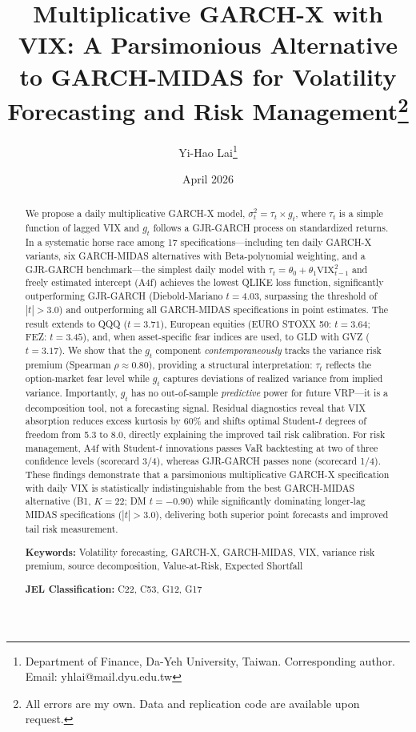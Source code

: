 \documentclass[12pt,a4paper]{article}
\title{Multiplicative GARCH-X with VIX: A Parsimonious Alternative to GARCH-MIDAS for Volatility Forecasting and Risk Management\thanks{All errors are my own. Data and replication code are available upon request.}}
\author{Yi-Hao Lai\thanks{Department of Finance, Da-Yeh University, Taiwan. Corresponding author. Email: yhlai@mail.dyu.edu.tw}}
\date{April 2026}
\begin{document}
\maketitle

\begin{abstract}
\noindent
We propose a daily multiplicative GARCH-X model, $\sigma_t^2 = \tau_t \times g_t$, where $\tau_t$ is a simple function of lagged VIX and $g_t$ follows a GJR-GARCH process on standardized returns. In a systematic horse race among 17 specifications---including ten daily GARCH-X variants, six GARCH-MIDAS alternatives with Beta-polynomial weighting, and a GJR-GARCH benchmark---the simplest daily model with $\tau_t = \theta_0 + \theta_1 \mathrm{VIX}_{t-1}^2$ and freely estimated intercept (A4f) achieves the lowest QLIKE loss function, significantly outperforming GJR-GARCH (Diebold-Mariano $t = 4.03$, surpassing the \citet{harvey2016} threshold of $|t| > 3.0$) and outperforming all GARCH-MIDAS specifications in point estimates. The result extends to QQQ ($t = 3.71$), European equities (EURO STOXX 50: $t = 3.64$; FEZ: $t = 3.45$), and, when asset-specific fear indices are used, to GLD with GVZ ($t = 3.17$). We show that the $g_t$ component \emph{contemporaneously} tracks the variance risk premium (Spearman $\rho \approx 0.80$), providing a structural interpretation: $\tau_t$ reflects the option-market fear level while $g_t$ captures deviations of realized variance from implied variance. Importantly, $g_t$ has no out-of-sample \emph{predictive} power for future VRP---it is a decomposition tool, not a forecasting signal. Residual diagnostics reveal that VIX absorption reduces excess kurtosis by 60\% and shifts optimal Student-$t$ degrees of freedom from 5.3 to 8.0, directly explaining the improved tail risk calibration. For risk management, A4f with Student-$t$ innovations passes VaR backtesting at two of three confidence levels (scorecard 3/4), whereas GJR-GARCH passes none (scorecard 1/4). These findings demonstrate that a parsimonious multiplicative GARCH-X specification with daily VIX is statistically indistinguishable from the best GARCH-MIDAS alternative (B1, $K=22$; DM $t = -0.90$) while significantly dominating longer-lag MIDAS specifications ($|t| > 3.0$), delivering both superior point forecasts and improved tail risk measurement.

\medskip
\noindent
\textbf{Keywords:} Volatility forecasting, GARCH-X, GARCH-MIDAS, VIX, variance risk premium, source decomposition, Value-at-Risk, Expected Shortfall

\medskip
\noindent
\textbf{JEL Classification:} C22, C53, G12, G17
\end{abstract}
\end{document}
